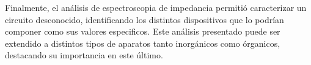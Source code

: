 Finalmente, el análisis de espectroscopia de impedancia permitió caracterizar un circuito desconocido, identificando los distintos dispositivos que lo podrían componer como sus valores especificos. Este análisis presentado puede ser extendido a distintos tipos de aparatos tanto inorgánicos como órganicos, destacando su importancia en este último.